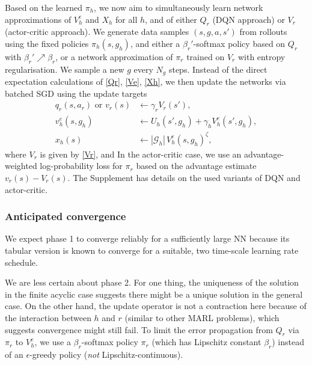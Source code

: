 \documentclass[letterpaper]{article} %
\def\G{\mathcal{G}}
\begin{document}
Based on the learned $\pi_h$, we now aim to simultaneously learn network approximations of $V^e_h$ and $X_h$ for all $h$, and of either $Q_r$ (DQN approach) or $V_r$ (actor-critic approach).
We generate data samples $(s,g,a,s')$ from rollouts using the fixed policies $\pi_h(s,g_h)$, 
and either a $\beta_r'$-softmax policy based on $Q_r$ with $\beta_r'\nearrow\beta_r$, or a network approximation of $\pi_r$ trained on $V_r$ with entropy regularisation.  
We sample a new $g$ every $N_g$ steps.
Instead of the direct expectation calculations of \eqref{Qr}, \eqref{Ve}, \eqref{Xh}, 
we then update the networks via batched SGD using the update targets
\begin{align}
    q_r(s,a_r)\text{~or~}v_r(s) &\gets \gamma_r V_r(s'), \label{qrvr} \\
    v^e_h(s,g_h) &\gets U_h(s',g_h) + \gamma_h V^e_h(s',g_h), \label{qe} \\
    x_h(s) &\gets |\G_h|\,V^e_h(s,g_h)^\zeta, \label{wh} 
\end{align}
where $V_r$ is given by \eqref{Vr}, and 
In the actor-critic case, we use an advantage-weighted log-probability loss for $\pi_r$ based on the advantage estimate $v_r(s) - V_r(s)$.
The Supplement has details on the used variants of DQN and actor-critic. 



\subsubsection{Anticipated convergence}

We expect phase 1 to converge reliably for a sufficiently large NN because its tabular version is known to converge for a suitable, two time-scale learning rate schedule.

We are less certain about phase 2. For one thing, the uniqueness of the solution in the finite acyclic case suggests there might be a unique solution in the general case. On the other hand, the update operator is not a contraction here because of the interaction between $h$ and $r$ (similar to other MARL problems), which suggests convergence might still fail. To limit the error propagation from $Q_r$ via $\pi_r$ to $V^e_h$, we use a $\beta_r$-softmax policy $\pi_r$ (which has Lipschitz constant $\beta_r$) instead of an $\epsilon$-greedy policy ({\em not} Lipschitz-continuous).
\end{document}
